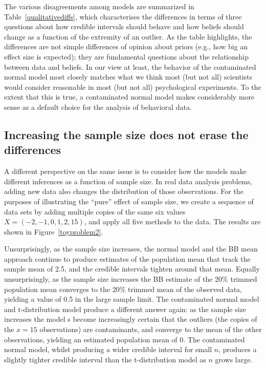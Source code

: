 \documentclass[doc]{apa6}
\begin{document}
{The various disagreements among models are summarized in Table~\ref{qualitativediffs}, which characterises the differences in terms of three questions about how credible intervals should behave and how beliefs should change as a function of the extremity of an outlier. As the table highlights, the differences are not simple differences of opinion about priors (e.g., how big an effect size is expected); they are fundamental questions about the relationship between data and beliefs. In our view at least, the behavior of the contaminated normal model most closely matches what we think most (but not all) scientists would consider reasonable in most (but not all) psychological experiments. To the extent that this is true, a contaminated normal model makes considerably more sense as a default choice for the analysis of behavioral data.


\subsection{Increasing the sample size does not erase the differences}

A different perspective on the same issue is to consider how the models make different inferences as a function of sample size. In real data analysis problems, adding new data also changes the distribution of those observations. For the purposes of illustrating the ``pure'' effect of sample size, we create a sequence of data sets by adding multiple copies of the same six values $X=(-2,-1,0,1,2,15)$, and apply all     five   methods to the data. The results are shown in Figure~\ref{toyproblem2}.

Unsurprisingly, as the sample size increases, the normal model and the BB mean approach continue to produce estimates of the population mean that track the sample mean of 2.5, and the credible intervals tighten around that mean. Equally unsurprisingly, as the sample size increases the BB estimate of the 20\% trimmed population mean  converges to the 20\% trimmed mean of the observed data, yielding a value of 0.5 in the large sample limit. The contaminated normal model   and t-distribution model   produce      a different answer again: as the sample size increases the model s   become     increasingly certain that the outliers (the copies of the $x=15$ observations) are contaminants, and       converge      to the mean of the other observations, yielding an estimated population mean of 0.   The contaminated normal model, whilst producing a wider credible interval for small $n$, produces  a slightly tighter credible interval than the t-distribution model as $n$ grows large.

}
\end{document}
